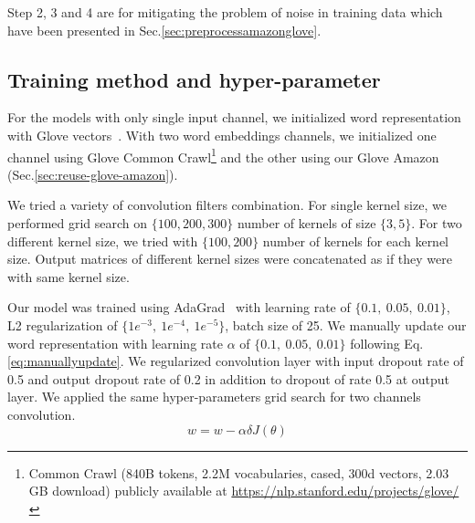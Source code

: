 Step 2, 3 and 4 are for mitigating the problem of noise in training data which have been presented in Sec.\ref{sec:preprocessamazonglove}.

\subsection{Training method and hyper-parameter}
For the models with only single input channel, we initialized word representation with Glove vectors~\cite{glove}.
With two word embeddings channels, we initialized one channel using Glove Common Crawl\footnote{\label{glovecommoncrawl}Common Crawl (840B tokens, 2.2M vocabularies, cased, 300d vectors, 2.03 GB download) publicly available at \url{https://nlp.stanford.edu/projects/glove/}} and the other using our Glove Amazon (Sec.\ref{sec:reuse-glove-amazon}).

We tried a variety of convolution filters combination.
For single kernel size, we performed grid search on $\{100, 200, 300\}$ number of kernels of size $\{3, 5\}$.
For two different kernel size, we tried with $\{100, 200\}$ number of kernels for each kernel size.
Output matrices of different kernel sizes were concatenated as if they were with same kernel size.

Our model was trained using AdaGrad~\cite{duchi2011adaptive} with learning rate of $\{0.1,~ 0.05,~ 0.01\}$, L2 regularization of $\{1e^{-3},~ 1e^{-4}, ~ 1e^{-5} \}$, batch size of 25.
We manually update our word representation with learning rate $\alpha$ of $\{0.1,~0.05, ~0.01\}$ following Eq.\ref{eq:manuallyupdate}.
We regularized convolution layer with input dropout rate of 0.5 and output dropout rate of 0.2 in addition to dropout of rate 0.5 at output layer.
We applied the same hyper-parameters grid search for two channels convolution.
\begin{equation}
\label{eq:manuallyupdate}
w = w - \alpha\delta J(\theta)
\end{equation}
